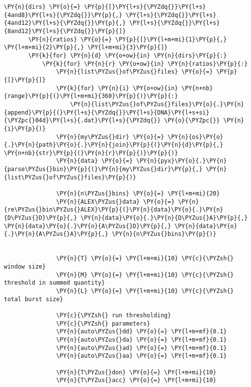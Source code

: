 \begin{Verbatim}[commandchars=\\\{\}, fontsize=\scriptsize]
       \PY{n}{dirs} \PY{o}{=} \PY{p}{[}\PY{l+s}{\PYZdq{}}\PY{l+s}{4and8}\PY{l+s}{\PYZdq{}}\PY{p}{,} \PY{l+s}{\PYZdq{}}\PY{l+s}{4and12}\PY{l+s}{\PYZdq{}}\PY{p}{,} \PY{l+s}{\PYZdq{}}\PY{l+s}{8and12}\PY{l+s}{\PYZdq{}}\PY{p}{]}
       \PY{n}{ratios} \PY{o}{=} \PY{p}{[}\PY{l+m+mi}{1}\PY{p}{,} \PY{l+m+mi}{2}\PY{p}{,} \PY{l+m+mi}{3}\PY{p}{]}
       \PY{k}{for} \PY{n}{d} \PY{o+ow}{in} \PY{n}{dirs}\PY{p}{:}
           \PY{k}{for} \PY{n}{r} \PY{o+ow}{in} \PY{n}{ratios}\PY{p}{:}      
               \PY{n}{list\PYZus{}of\PYZus{}files} \PY{o}{=} \PY{p}{[}\PY{p}{]}
               \PY{k}{for} \PY{n}{i} \PY{o+ow}{in} \PY{n+nb}{range}\PY{p}{(}\PY{l+m+mi}{360}\PY{p}{)}\PY{p}{:}
                   \PY{n}{list\PYZus{}of\PYZus{}files}\PY{o}{.}\PY{n}{append}\PY{p}{(}\PY{l+s}{\PYZdq{}}\PY{l+s}{DNA}\PY{l+s+si}{\PYZpc{}04d}\PY{l+s}{.dat}\PY{l+s}{\PYZdq{}} \PY{o}{\PYZpc{}} \PY{n}{i}\PY{p}{)}
               \PY{n}{my\PYZus{}dir} \PY{o}{=} \PY{n}{os}\PY{o}{.}\PY{n}{path}\PY{o}{.}\PY{n}{join}\PY{p}{(}\PY{n}{d}\PY{p}{,} \PY{n+nb}{str}\PY{p}{(}\PY{n}{r}\PY{p}{)}\PY{p}{)}
               \PY{n}{data} \PY{o}{=} \PY{n}{pyx}\PY{o}{.}\PY{n}{parse\PYZus{}bin}\PY{p}{(}\PY{n}{my\PYZus{}dir}\PY{p}{,} \PY{n}{list\PYZus{}of\PYZus{}files}\PY{p}{)}
       
               \PY{n}{n\PYZus{}bins} \PY{o}{=} \PY{l+m+mi}{20}
               \PY{n}{ALEX\PYZus{}data} \PY{o}{=} \PY{n}{re\PYZus{}bin\PYZus{}ALEX}\PY{p}{(}\PY{n}{data}\PY{o}{.}\PY{n}{D\PYZus{}D}\PY{p}{,} \PY{n}{data}\PY{o}{.}\PY{n}{D\PYZus{}A}\PY{p}{,} \PY{n}{data}\PY{o}{.}\PY{n}{A\PYZus{}D}\PY{p}{,} \PY{n}{data}\PY{o}{.}\PY{n}{A\PYZus{}A}\PY{p}{,} \PY{n}{n\PYZus{}bins}\PY{p}{)}
               
                   
               \PY{n}{T} \PY{o}{=} \PY{l+m+mi}{10} \PY{c}{\PYZsh{} window size}
               \PY{n}{M} \PY{o}{=} \PY{l+m+mi}{10} \PY{c}{\PYZsh{} threshold in summed quantity}
               \PY{n}{L} \PY{o}{=} \PY{l+m+mi}{10} \PY{c}{\PYZsh{} total burst size}
                   
               \PY{c}{\PYZsh{} run thresholding}
               \PY{c}{\PYZsh{} parameters}
               \PY{n}{auto\PYZus{}dd} \PY{o}{=} \PY{l+m+mf}{0.1}
               \PY{n}{auto\PYZus{}da} \PY{o}{=} \PY{l+m+mf}{0.1}
               \PY{n}{auto\PYZus{}ad} \PY{o}{=} \PY{l+m+mf}{0.1}
               \PY{n}{auto\PYZus{}aa} \PY{o}{=} \PY{l+m+mf}{0.1}
               
               \PY{n}{T\PYZus{}don} \PY{o}{=} \PY{l+m+mi}{10}
               \PY{n}{T\PYZus{}acc} \PY{o}{=} \PY{l+m+mi}{10}
               

\end{Verbatim}
